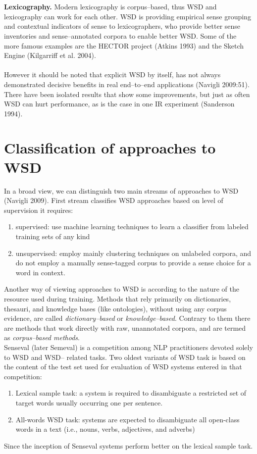 \\\\  
\textbf{Lexicography.} Modern lexicography is corpus--based, thus WSD and lexicography can work 
for each other. WSD is providing empirical sense grouping and contextual indicators of sense to lexicographers, who 
provide better sense inventories and sense--annotated corpora to enable better WSD. Some of the more famous examples are the 
HECTOR project (Atkins 1993) and the Sketch Engine (Kilgarriff et al. 2004).
\\\\ 
 However it should be noted that explicit WSD by itself, has not always demonstrated decisive benefits in real 
end--to--end applications (Navigli 2009:51). There have been isolated results that show some improvements,
but just as often WSD can hurt performance, as is the case in one IR experiment (Sanderson 1994).

\section{Classification of approaches to WSD}
In a broad view, we can distinguish two main streams of approaches to WSD (Navigli 2009). First stream classifies WSD 
approaches based on level of supervision it requires:
\begin{enumerate}
\item supervised:  use machine learning techniques to learn a classifier from labeled training sets of any kind
\item unsupervised: employ mainly clustering techniques on unlabeled corpora, and do not employ a manually sense-tagged corpus to provide a sense choice for a word in context. 
\end{enumerate} 
Another way of viewing approaches to WSD is according to the nature of the resource used during training. Methods that rely primarily on dictionaries, thesauri, and knowledge bases (like ontologies), without using any corpus evidence, are called  \textit{dictionary--based} or \textit{knowledge--based}. Contrary to them there are methods that work directly with raw, unannotated corpora, and are termed as \textit{corpus--based methods}. 
\\
Senseval (later Semeval) is a competition among NLP practitioners devoted solely to WSD and WSD--
related tasks. Two oldest variants of WSD task is based on the content of the test set used for evaluation
of WSD systems entered in that competition:
\begin{enumerate}
\item Lexical sample task: a system is required to disambiguate a restricted set of target words usually occurring one per sentence.
\item All-words WSD task: systems are expected to disambiguate all open-class words in a text (i.e., nouns, verbs, adjectives, and adverbs)
\end{enumerate} 
Since the inception of Senseval systems perform better on the lexical sample task.


